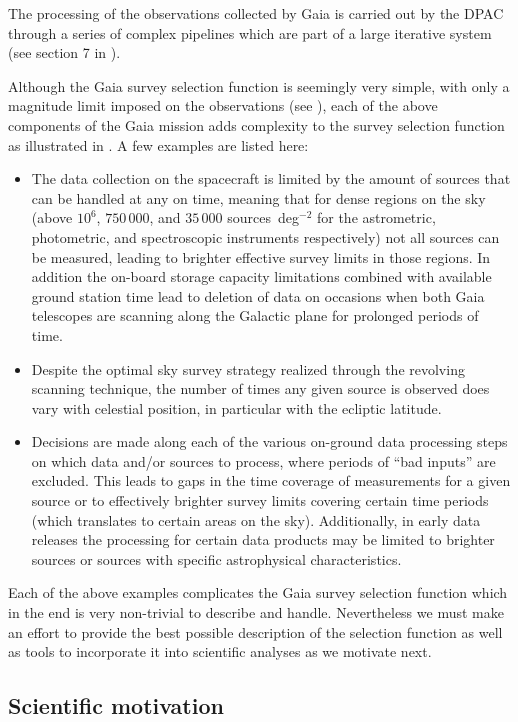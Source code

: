 The processing of the observations collected by Gaia is carried out by the DPAC through a series of complex pipelines which are part of a large iterative system (see section 7 in \cite{2016A&A...595A...1G}).

Although the Gaia survey selection function is seemingly very simple, with only a magnitude limit imposed on the observations (see ), each of the above components of the Gaia mission adds complexity to the survey selection function as illustrated in . A few examples are listed here:
\begin{itemize}
    \item The data collection on the spacecraft is limited by the amount of sources that can be handled at any on time, meaning that for dense regions on the sky (above $10^6$, $750\,000$, and $35\,000$ sources~deg$^{-2}$ for the astrometric, photometric, and spectroscopic instruments respectively) not all sources can be measured, leading to brighter effective survey limits in those regions. In addition the on-board storage capacity limitations combined with available ground station time lead to deletion of data on occasions when both Gaia telescopes are scanning along the Galactic plane for prolonged periods of time.
    \item Despite the optimal sky survey strategy realized through the revolving scanning technique, the number of times any given source is observed does vary with celestial position, in particular with the ecliptic latitude.
    \item Decisions are made along each of the various on-ground data processing steps on which data and/or sources to process, where periods of ``bad inputs'' are excluded. This leads to gaps in the time coverage of measurements for a given source or to effectively brighter survey limits covering certain time periods (which translates to certain areas on the sky). Additionally, in early data releases the processing for certain data products may be limited to brighter sources or sources with specific astrophysical characteristics.
\end{itemize}
Each of the above examples complicates the Gaia survey selection function which in the end is very non-trivial to describe and handle. Nevertheless we must make an effort to provide the best possible description of the selection function as well as tools to incorporate it into scientific analyses as we motivate next.

\subsection{Scientific motivation}
\label{sec:scientific-motivation}


